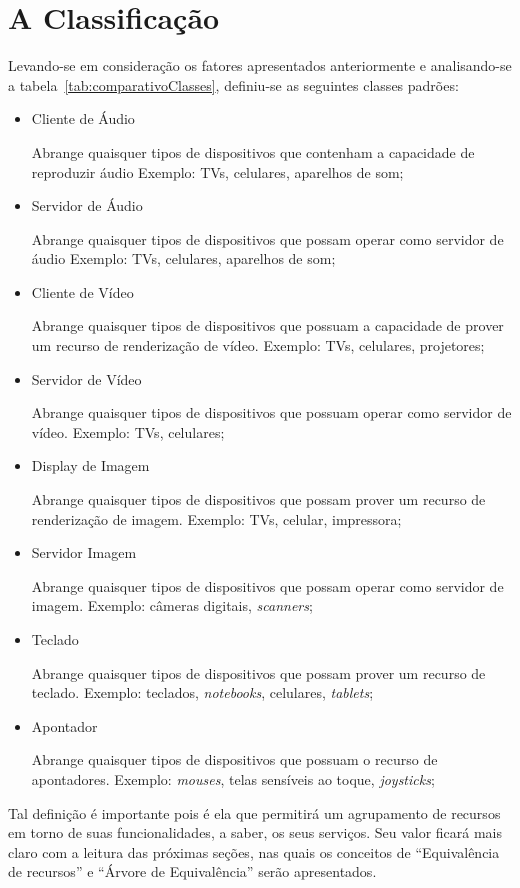\section{A Classificação}
\label{sec:Aclassficacao}
Levando-se em consideração os fatores apresentados anteriormente e analisando-se a tabela~\ref{tab:comparativoClasses}, definiu-se as seguintes classes padrões:

\begin{itemize}
	\item Cliente de Áudio
		
		Abrange quaisquer tipos de dispositivos que contenham a capacidade de reproduzir áudio Exemplo: TVs, celulares, aparelhos de som;
	\item Servidor de Áudio
		
		Abrange quaisquer tipos de dispositivos que possam operar como servidor de áudio Exemplo: TVs, celulares, aparelhos de som;
	\item Cliente de Vídeo
		
		Abrange quaisquer tipos de dispositivos que possuam a capacidade de prover um recurso de renderização de vídeo. Exemplo: TVs, celulares, projetores;
	\item Servidor de Vídeo
		
		Abrange quaisquer tipos de dispositivos que possuam operar como servidor de vídeo. Exemplo: TVs, celulares;
	\item Display de Imagem
		
		Abrange quaisquer tipos de dispositivos que possam prover um recurso de renderização de imagem. Exemplo: TVs, celular, impressora;
	\item Servidor Imagem
		
		Abrange quaisquer tipos de dispositivos que possam operar como servidor de imagem. Exemplo: câmeras digitais, \emph{scanners};
	\item Teclado
		
		Abrange quaisquer tipos de dispositivos que possam prover um recurso de teclado. Exemplo: teclados, \emph{notebooks}, celulares, \emph{tablets};
	\item Apontador
		
		Abrange quaisquer tipos de dispositivos que possuam o recurso de apontadores. Exemplo: \emph{mouses}, telas sensíveis ao toque, \emph{joysticks};
\end{itemize}

Tal definição é importante pois é ela que permitirá um agrupamento de recursos em torno de suas funcionalidades, a saber, os seus serviços. Seu valor ficará mais claro com a leitura das próximas seções, nas quais os conceitos de ``Equivalência de recursos'' e ``Árvore de Equivalência'' serão apresentados.

